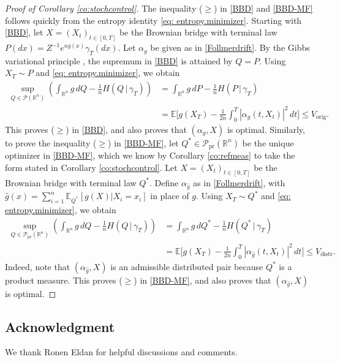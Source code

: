 \documentclass[11pt,reqno]{amsart}
\numberwithin{equation}{section}
\theoremstyle{definition}
\def\E{{\mathbb E}}
\def\R{{\mathbb R}}
\def\P{{\mathcal P}}
\def\Pprod{\P_{\mathrm{pr}}}
\begin{document}
\begin{proof}[Proof of Corollary \ref{co:stochcontrol}]
		The inequality ($\ge$) in \eqref{BBD} and \eqref{BBD-MF} follows quickly from the entropy identity \eqref{eq: entropy.minimizer}. Starting with \eqref{BBD}, let $X=(X_t)_{t \in [0,T]}$ be the Brownian bridge with terminal law   $P(dx)=Z^{-1}e^{ng(x)}\gamma_T(dx)$. Let $\alpha_g$ be given as in \eqref{Follmerdrift}. By the Gibbs variational principle \cite[Proposition 1.4.2]{dupuis2011weak}, the supremum in \eqref{BBD} is attained by $Q=P$. Using $X_T \sim P$ and \eqref{eq: entropy.minimizer}, we obtain
		\begin{align*}
			\sup_{Q \in \P(\R^n)} \left(\int_{\R^n} g\,dQ - \frac{1}{n}H(Q\,|\,\gamma_T)\right) &= \int_{\R^n} g\,dP - \frac{1}{n}H(P\,|\,\gamma_T)  \\
			&= \E\bigg[ g(X_T) - \frac{1}{2n}\int_0^T |\alpha_g(t,X_t)|^2\,dt\bigg] \le V_{\mathrm{orig}}.
		\end{align*}
		This proves ($\ge$) in \eqref{BBD}, and also proves that $(\alpha_g,X)$ is optimal.
		Similarly, to prove the inequality ($\ge$) in \eqref{BBD-MF}, let $Q^* \in\Pprod(\R^n)$ be the unique optimizer in \eqref{BBD-MF}, which we know by Corollary \ref{co:refmeas} to take the form stated in Corollary \ref{co:stochcontrol}. Let $X=(X_t)_{t \in [0,T]}$ be the Brownian bridge with terminal law $Q^*$. Define $\alpha_{\widehat{g}}$ as in \eqref{Follmerdrift}, with $\widehat{g}(x)=\sum_{i=1}^n\E_{Q^*}[g(X)|X_i=x_i]$ in place of $g$. Using $X_T \sim Q^*$ and \eqref{eq: entropy.minimizer}, we obtain
		\begin{align*}
			\sup_{Q \in \Pprod(\R^n)} \left(\int_{\R^n} g\,dQ - \frac{1}{n}H(Q\,|\,\gamma_T)\right) &= \int_{\R^n} g\,dQ^* - \frac{1}{n}H(Q^*\,|\,\gamma_T)  \\
			&= \E\bigg[ g(X_T) - \frac{1}{2n}\int_0^T |\alpha_{\widehat{g}}(t,X_t)|^2\,dt\bigg] \le V_{\mathrm{distr}}.
		\end{align*}
		Indeed, note that $(\alpha_{\widehat{g}},X)$ is an admissible distributed pair because $Q^*$ is a product measure.
		This proves ($\ge$) in \eqref{BBD-MF}, and also proves that $(\alpha_{\widehat{g}},X)$ is optimal. 
\end{proof}

\subsection*{Acknowledgment}
We thank Ronen Eldan for helpful discussions and comments.



\end{document}
